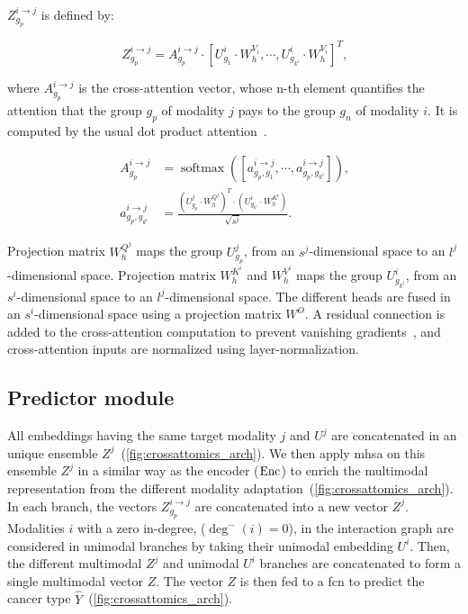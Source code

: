 \documentclass[../main.tex]{subfiles}
\begin{document}
	    \(Z^{i\rightarrow j}_{g_p}\) is defined by:

	    \begin{equation}
	        Z^{i\rightarrow j}_{g_p} = A^{i\rightarrow j}_{g_p} \cdot \left[ U^{i}_{g_1} \cdot W_{h}^{V_i}, \cdots ,  U^{i}_{g_{k^i}} \cdot W_{h}^{V_i}\right]^T \text{,} \label{eq:cross_att}
	    \end{equation}

	    where \(A^{i\rightarrow j}_{g_p}\) is the cross-attention vector, whose n-th element quantifies the attention that the group \(g_p\) of modality \(j\) pays to the group \(g_n\) of modality \(i\).
	    It is computed by the usual dot product attention~\cite{AttentionAllYouNeed}.

	    \begin{align}
	        A^{i\rightarrow j}_{g_p}         & = \operatorname{softmax}\left( \left[ a^{i\rightarrow j}_{g_p,g_1}, \cdots, a^{i\rightarrow j}_{g_p,g_{k^i}} \right] \right) \text{,} \label{eq:cross_att_weights} \\
	        a^{i\rightarrow j}_{g_p,g_{k^i}} & = \frac{\left(U^{j}_{g_p} \cdot W_{h}^{Q^j}\right)^T \cdot \left(U^{i}_{g_{k^i}} \cdot W_{h}^{K^i} \right)}{\sqrt{s^{j}}} \text{.}\label{eq:cross_att_weight}
	    \end{align}

	    Projection matrix \(W^{Q^j}_{h}\) maps the group \(U^{j}_{g_p}\), from an \(s^j\)-dimensional space to an \(l^j\)-dimensional space.
	    Projection matrix \(W^{K^i}_{h}\) and \(W^{V^i}_{h}\) maps the group \(U^{i}_{g_{k^i}}\), from an \(s^i\)-dimensional space to an \(l^j\)-dimensional space.
	    The different heads are fused in an \(s^{i}\)-dimensional space using a projection matrix \(W^O\).
	    A residual connection is added to the cross-attention computation to prevent vanishing gradients~\cite{AttentionAllYouNeed}, and cross-attention inputs are normalized using layer-normalization.

	\subsection{Predictor module}
	    All embeddings having the same target modality \(j\) and \(U^j\) are concatenated in an unique ensemble \(Z^j\)~(\cref{fig:crossattomics_arch}).
	    We then apply \gls{mhsa} on this ensemble \(Z^j\) in a similar way as the encoder (\(\operatorname{Enc}\)) to enrich the multimodal representation from the different modality adaptation~(\cref{fig:crossattomics_arch}).
	    In each branch, the vectors \(Z^{i\rightarrow j}_{g_p}\) are concatenated into a new vector \(Z^j\).
	    Modalities \(i\) with a zero in-degree, (\(\operatorname{deg}^{-}\left(i\right) = 0\)), in the interaction graph are considered in unimodal branches by taking their unimodal embedding \(U^i\).
	    Then, the different multimodal \(Z^j\) and unimodal \(U^i\) branches are concatenated to form a single multimodal vector \(Z\).
	    The vector \(Z\) is then fed to a \gls{fcn} to predict the cancer type \(\hat{Y}\)~(\cref{fig:crossattomics_arch}).
\end{document}
